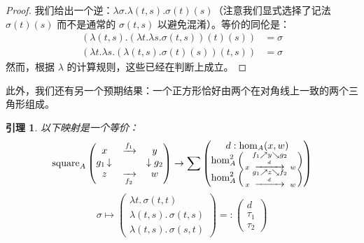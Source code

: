 \documentclass{ctexrep}
\theoremstyle{plain}
\newtheorem{lemma}[theorem]{引理}
\theoremstyle{definition}
\theoremstyle{remark}
\theoremstyle{definition}
\theoremstyle{definition}
\theoremstyle{definition}
\begin{document}
\begin{proof}
我们给出一个逆：$\lambda \sigma.\lambda(t,s).\sigma(t)(s)$（注意我们显式选择了记法 $\sigma(t)(s)$ 而不是通常的 $\sigma(t,s)$ 以避免混淆）。等价的同伦是：
\begin{align*}
(\lambda(t,s).(\lambda t.\lambda s.\sigma(t,s))(t)(s)) &= \sigma \\ (\lambda t.\lambda s.(\lambda(t,s).\sigma(t)(s))(t,s)) &= \sigma
\end{align*}
然而，根据 $\lambda$ 的计算规则，这些已经在判断上成立。
\end{proof}

此外，我们还有另一个预期结果：一个正方形恰好由两个在对角线上一致的两个三角形组成。

\begin{lemma}
以下映射是一个等价：
\[
\text{square}_A \left( 
\begin{matrix} 
x & \xrightarrow{f_1} & y \\ 
g_1 \left\downarrow \rule{0pt}{1.5ex} \right. & & \left\downarrow \rule{0pt}{1.5ex} \right. g_2 \\ 
z & \xrightarrow[f_2]{} & w 
\end{matrix} 
\right) \to \sum \left( 
\begin{matrix} 
d : \text{hom}_A(x, w) \\ 
\text{hom}_A^2 \left( \begin{smallmatrix} & f_1 \nearrow y \searrow g_2 & \\ x & \xrightarrow{\quad d \quad} & w \end{smallmatrix} \right) \\ 
\text{hom}_A^2 \left( \begin{smallmatrix} & g_1 \nearrow z \searrow f_2 & \\ x & \xrightarrow{\quad d \quad} & w \end{smallmatrix} \right) 
\end{matrix} 
\right)
\]
\[
\sigma \mapsto \begin{pmatrix} \lambda t. \, \sigma(t, t) \\ \lambda(t, s). \, \sigma(t, s) \\ \lambda(t, s). \, \sigma(s, t) \end{pmatrix} =: \begin{pmatrix} d \\ \tau_1 \\ \tau_2 \end{pmatrix}
\]
\end{lemma}
\end{document}
